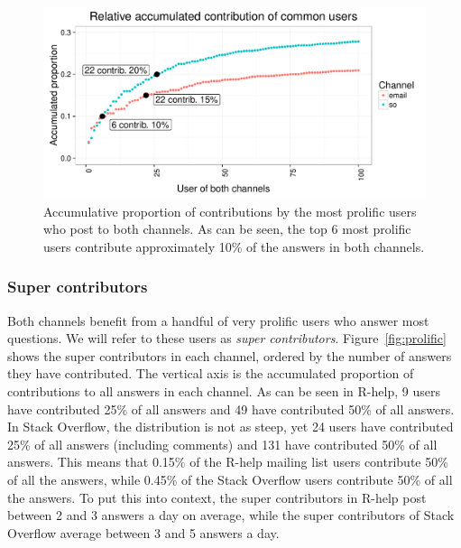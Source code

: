 \documentclass[smallextended]{svjour3}       %
\newcommand{\SO}{Stack Overflow\xspace}
\newcommand{\RH}{R-help\xspace}
\begin{document}
\begin{figure}[htbp]
  \centering
  \includegraphics[width=.95\textwidth]{figs/common.pdf}
  \caption{Accumulative proportion of contributions by the most prolific users who post to both channels. As can be seen, the top 6
    most prolific users contribute approximately 10\% of the answers in both channels.}
  \label{fig:common}
\end{figure}

\subsubsection{Super contributors}

Both channels benefit from a handful of very prolific users who answer most questions. We will refer to these users as
\textit{super contributors}. Figure~\ref{fig:prolific} shows the super contributors in each channel, ordered by the number of
answers they have contributed. The vertical axis is the accumulated proportion of contributions to all answers in
each channel. As can be seen in \RH, 9 users have contributed 25\% of all answers and 49 have contributed 50\% of all answers. In \SO, the distribution is not as
steep, yet 24 users have contributed 25\% of all answers (including comments) and 131 have contributed 50\% of all answers. This
means that 0.15\% of the \RH mailing list users contribute 50\% of all the answers, while 0.45\% of the \SO users contribute 50\%
of all the answers. To put this into context, the super contributors in \RH post between 2 and 3 answers a day on average, while the
super contributors of \SO average between 3 and 5 answers a day.
\end{document}
